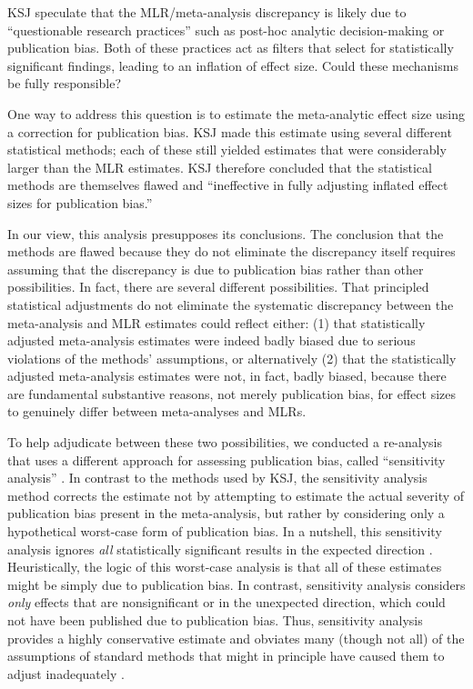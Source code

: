 \documentclass[man,floatsintext]{apa7}
\begin{document}
KSJ speculate that the MLR/meta-analysis discrepancy is likely due to “questionable research practices” \parencite{masicampo2012peculiar} such as post-hoc analytic decision-making or publication bias. Both of these practices act as filters that select for statistically significant findings, leading to an inflation of effect size. Could these mechanisms be fully responsible? 

One way to address this question is to estimate the meta-analytic effect size using a correction for publication bias. KSJ made this estimate using several different statistical methods; each of these still yielded estimates that were considerably larger than the MLR estimates. KSJ therefore concluded that the statistical methods are themselves flawed and ``ineffective in fully adjusting inflated effect sizes for publication bias.'' 

In our view, this analysis presupposes its conclusions. The conclusion that the methods are flawed because they do not eliminate the discrepancy itself requires assuming that the discrepancy is due to publication bias rather than other possibilities. In fact, there are several different possibilities. That principled statistical adjustments \parencite{vevea1995general} do not eliminate the systematic discrepancy between the meta-analysis and MLR estimates could reflect either: (1) that statistically adjusted meta-analysis estimates were indeed badly biased due to serious violations of the methods' assumptions, or alternatively (2) that the statistically adjusted meta-analysis estimates were not, in fact, badly biased, because there are fundamental substantive reasons, not merely publication bias, for effect sizes to genuinely differ between meta-analyses and MLRs.  

To help adjudicate between these two possibilities, we conducted a re-analysis that uses a different approach for assessing publication bias, called ``sensitivity analysis'' \parencite{mathur2019sensitivity}. In contrast to the methods used by KSJ, the sensitivity analysis method corrects the estimate not by attempting to estimate the actual severity of publication bias present in the meta-analysis, but rather by considering only a hypothetical worst-case form of publication bias. In a nutshell, this sensitivity analysis ignores \emph{all} statistically significant results in the expected direction \parencite{mathur2019sensitivity}. Heuristically, the logic of this worst-case analysis is that all of these estimates might be simply due to publication bias. In contrast, sensitivity analysis considers \emph{only} effects that are nonsignificant or in the unexpected direction, which could not have been published due to publication bias. Thus, sensitivity analysis provides a highly conservative estimate and obviates many (though not all) of the assumptions of standard methods that might in principle have caused them to adjust inadequately \parencite{mathur2019sensitivity}.
\end{document}
